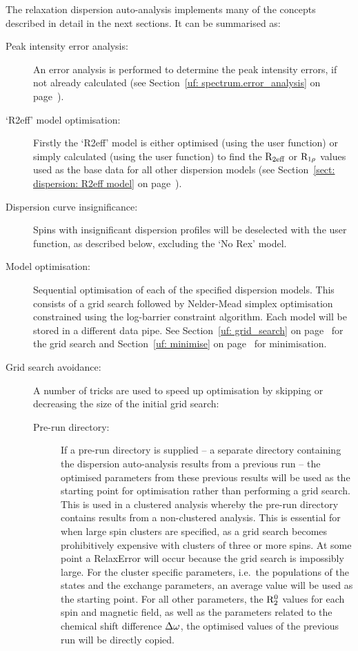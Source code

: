 The relaxation dispersion auto-analysis implements many of the concepts described in detail in the next sections.
It can be summarised as:
\begin{description}
\item[Peak intensity error analysis:]  An error analysis is performed to determine the peak intensity errors, if not already calculated (see Section~\ref{uf: spectrum.error_analysis} on page~\pageref{uf: spectrum.error_analysis}).
\item[`R2eff' model optimisation:]  Firstly the `R2eff' model is either optimised (using the  user function) or simply calculated (using the  user function) to find the $\mathrm{R}_\textrm{2eff}$ or $\mathrm{R}_{1\rho}$ values used as the base data for all other dispersion models (see Section~\ref{sect: dispersion: R2eff model} on page~\pageref{sect: dispersion: R2eff model}).
\item[Dispersion curve insignificance:]  Spins with insignificant dispersion profiles will be deselected with the  user function, as described below, excluding the `No Rex' model.
\item[Model optimisation:]  Sequential optimisation of each of the specified dispersion models.  This consists of a grid search followed by Nelder-Mead simplex optimisation constrained using the log-barrier constraint algorithm.  Each model will be stored in a different data pipe.  See Section~\ref{uf: grid_search} on page~\pageref{uf: grid_search} for the grid search and Section~\ref{uf: minimise} on page~\pageref{uf: minimise} for minimisation.
\item[Grid search avoidance:]  A number of tricks are used to speed up optimisation by skipping or decreasing the size of the initial grid search:
\begin{description}
\item[Pre-run directory:]  If a pre-run directory is supplied -- a separate directory containing the dispersion auto-analysis results from a previous run -- the optimised parameters from these previous results will be used as the starting point for optimisation rather than performing a grid search.  This is used in a clustered analysis whereby the pre-run directory contains results from a non-clustered analysis.  This is essential for when large spin clusters are specified, as a grid search becomes prohibitively expensive with clusters of three or more spins.  At some point a RelaxError will occur because the grid search is impossibly large.  For the cluster specific parameters, i.e.\ the populations of the states and the exchange parameters, an average value will be used as the starting point.  For all other parameters, the $\mathrm{R}_2^0$ values for each spin and magnetic field, as well as the parameters related to the chemical shift difference $\Delta\omega$, the optimised values of the previous run will be directly copied.

\end{description}
\end{description}
